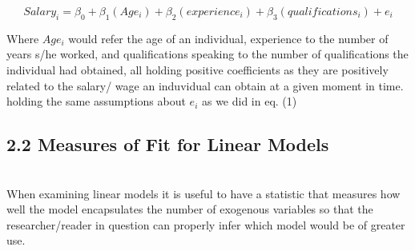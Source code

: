 \documentclass{article}
\begin{document}
\begin{enumerate}
   \begin{equation}
 Salary_{i} = \beta_{0} + \beta_{1}(Age_{i}) + \beta_{2}(experience_{i}) + \beta_{3}(qualifications_{i}) + e_{i} 
   \end{equation}
   
   Where $Age_{i}$ would refer the age of an individual, experience to the number of years s/he worked, and qualifications speaking to the number of qualifications the individual had obtained, all holding positive coefficients as they are positively related to the salary/ wage an induvidual can obtain at a given moment in time. holding the same assumptions about $e_{i}$ as we did in eq. (1)
   
\end{enumerate}
\subsection*{2.2 \space Measures of Fit for Linear Models}\\
\hspace{1.27cm} When examining linear models it is useful to have a statistic that measures how well the model encapsulates the number of exogenous variables so that the researcher/reader in question can properly infer which model would be of greater use. 
\end{document}
